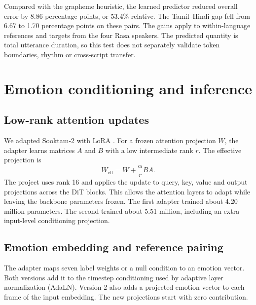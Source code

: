 \documentclass[11pt,a4paper]{article}
\newcommand{\sectionpage}[1]{\clearpage\section{#1}}
\begin{document}
Compared with the grapheme heuristic, the learned predictor reduced overall error by 8.86 percentage points, or 53.4\% relative. The Tamil--Hindi gap fell from 6.67 to 1.70 percentage points on these pairs. The gains apply to within-language references and targets from the four Rasa speakers. The predicted quantity is total utterance duration, so this test does not separately validate token boundaries, rhythm or cross-script transfer.

\sectionpage{Emotion conditioning and inference}
\subsection{Low-rank attention updates}
We adapted Sooktam-2 with LoRA \cite{lora}. For a frozen attention projection \(W\), the adapter learns matrices \(A\) and \(B\) with a low intermediate rank \(r\). The effective projection is
\[
 W_{\mathrm{eff}}=W+\frac{\alpha}{r}BA .
\]
The project uses rank 16 and applies the update to query, key, value and output projections across the DiT blocks. This allows the attention layers to adapt while leaving the backbone parameters frozen. The first adapter trained about 4.20 million parameters. The second trained about 5.51 million, including an extra input-level conditioning projection.

\subsection{Emotion embedding and reference pairing}
The adapter maps seven label weights or a null condition to an emotion vector. Both versions add it to the timestep conditioning used by adaptive layer normalization (AdaLN). Version 2 also adds a projected emotion vector to each frame of the input embedding. The new projections start with zero contribution.
\end{document}
